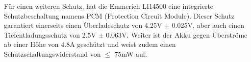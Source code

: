 Für einen weiteren Schutz, hat die Emmerich LI14500 eine integrierte Schutzbeschaltung namens PCM (Protection Circuit Module). Dieser Schutz garantiert einerseits einen Überladeschutz von 4.25V $\pm$ 0.025V, aber auch einen Tiefentladungsschutz von 2.5V $\pm$ 0.063V. Weiter ist der Akku gegen Überströme ab einer Höhe von 4.8A geschützt und weist zudem einen Schutzschaltungswiderstand von $\leq$ 75mW auf.

